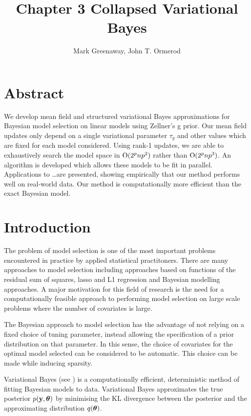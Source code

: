 \documentclass{amsart}[12pt]
\title{Chapter 3 Collapsed Variational Bayes}
\author{Mark Greenaway, John T. Ormerod}
\begin{document}
\maketitle

\section*{Abstract}


We develop mean field and structured variational Bayes approximations for Bayesian model selection on linear
models using Zellner's g prior. Our mean field updates only depend on a single variational parameter $\tau_g$
and other values which are fixed for each model considered. Using rank-1 updates, we are able to exhaustively
search the model space in $\text{O}(2^p np^2)$ rather than $\text{O}(2^p np^3)$. An algorithm is developed which
allows these models to be fit in parallel. Applications to  \ldots are presented, showing empirically that 
our method performs well on real-world data. Our method is computationally more efficient than the exact 
Bayesian model.

\section{Introduction}

The problem of model selection is one of the most important problems encountered in practice by
applied statistical practitoners. There are many approaches to model selection including approaches based on
functions of the residual sum of squares, lasso and L1 regression and Bayesian modelling approaches. A major
motivation for this field of research is the need for a computationally feasible approach to performing model 
selection on large scale problems where the number of covariates is large.

The Bayesian approach to model selection has the advantage of not relying on a fixed choice of tuning
parameter, instead allowing the specification of a prior distribution on that parameter. In this sense, the 
choice of covariates for the optimal model selected can be considered to be automatic. This choice can be
made while inducing sparsity.




Variational Bayes (see \cite{Ormerod2010}) is a computationally efficient, deterministic method of fitting
Bayesian models to data. Variational Bayes approximates the true posterior $p({\bf y}, {\boldsymbol \theta})$ by minimising the
KL divergence between the posterior and the  approximating distribution $q({\boldsymbol \theta})$.
\end{document}
